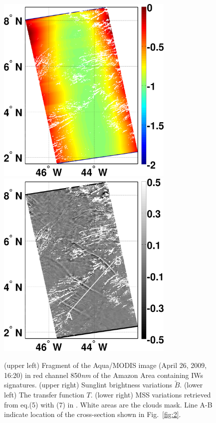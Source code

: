 \documentclass{report}
\begin{document}
\begin{figure}
\\
\noindent\includegraphics[width=20pc]{fig1c}
\hfill
\noindent\includegraphics[width=20pc]{fig1d}
\caption{(upper left)  Fragment of the Aqua/MODIS image (April 26, 2009, 16:20) in red channel 850\textit{nm} of the Amazon Area containing IWs signatures. (upper right) Sunglint brightness variations $\tilde{B}$. (lower left) The transfer function $T$. (lower right) MSS variations retrieved from eq.(5) with (7) in \citep{Kudryavtsev2012a}. White areas are the clouds mask. Line A-B indicate location of the cross-section shown in Fig.~\ref{fig:2}.}
\label{fig:1}
\end{figure}
\end{document}
